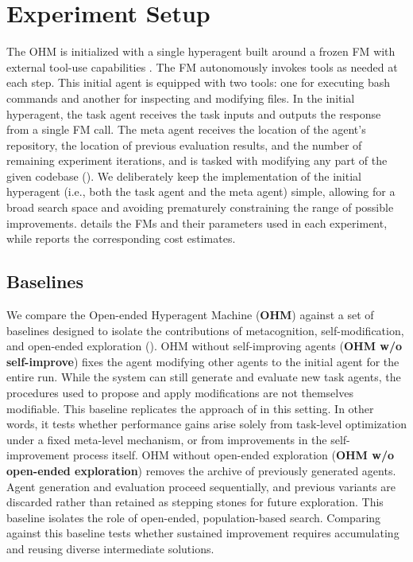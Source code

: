 \documentclass[]{fairmeta}
\begin{document}
\section{Experiment Setup}
\label{sec:exp-setup}

The OHM is initialized with a single hyperagent built around a frozen FM \citep{brown2020language} with external tool-use capabilities \citep{schick2023toolformer}. The FM autonomously invokes tools as needed at each step. This initial agent is equipped with two tools: one for executing bash commands and another for inspecting and modifying files. In the initial hyperagent, the task agent receives the task inputs and outputs the response from a single FM call. The meta agent receives the location of the agent's repository, the location of previous evaluation results, and the number of remaining experiment iterations, and is tasked with modifying any part of the given codebase (). We deliberately keep the implementation of the initial hyperagent (i.e., both the task agent and the meta agent) simple, allowing for a broad search space and avoiding prematurely constraining the range of possible improvements.  details the FMs and their parameters used in each experiment, while  reports the corresponding cost estimates.

\subsection{Baselines}
\label{sec:baselines}

We compare the Open-ended Hyperagent Machine (\textbf{OHM}) against a set of baselines designed to isolate the contributions of metacognition, self-modification, and open-ended exploration ().
OHM without self-improving agents (\textbf{OHM w/o self-improve}) fixes the agent modifying other agents to the initial agent for the entire run. While the system can still generate and evaluate new task agents, the procedures used to propose and apply modifications are not themselves modifiable. This baseline replicates the approach of \citet{huautomated} in this setting. In other words, it tests whether performance gains arise solely from task-level optimization under a fixed meta-level mechanism, or from improvements in the self-improvement process itself.
OHM without open-ended exploration (\textbf{OHM w/o open-ended exploration}) removes the archive of previously generated agents. Agent generation and evaluation proceed sequentially, and previous variants are discarded rather than retained as stepping stones for future exploration. This baseline isolates the role of open-ended, population-based search. Comparing against this baseline tests whether sustained improvement requires accumulating and reusing diverse intermediate solutions.
\end{document}
